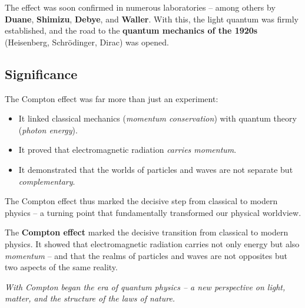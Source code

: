The effect was soon confirmed in numerous laboratories – among others by \textbf{Duane}, \textbf{Shimizu}, \textbf{Debye}, and \textbf{Waller}.  
With this, the light quantum was firmly established, and the road to the \textbf{quantum mechanics of the 1920s} 
(Heisenberg, Schrödinger, Dirac) was opened.

\vspace{1em}
\subsection{Significance}

The Compton effect was far more than just an experiment:

\begin{itemize}
	\item It linked classical mechanics (\emph{momentum conservation}) with quantum theory (\emph{photon energy}).
	\item It proved that electromagnetic radiation \emph{carries momentum}.
	\item It demonstrated that the worlds of particles and waves are not separate but \emph{complementary}.
\end{itemize}

The Compton effect thus marked the decisive step from classical to modern physics – 
a turning point that fundamentally transformed our physical worldview.

\begin{DidacticBox}
	The \textbf{Compton effect} marked the decisive transition from classical to modern physics. 
	It showed that electromagnetic radiation carries not only energy but also \emph{momentum} – 
	and that the realms of particles and waves are not opposites but two aspects of the same reality. 
	
	\vspace{0.5em}
	\emph{With Compton began the era of quantum physics – 
		a new perspective on light, matter, and the structure of the laws of nature.}
	\label{box:FazitCompton}
\end{DidacticBox}


